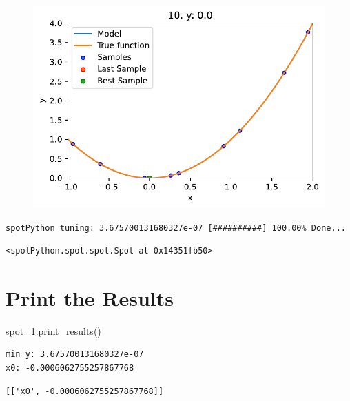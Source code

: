 \documentclass[
  letterpaper,
  DIV=11,
  numbers=noendperiod]{scrreprt}
\newenvironment{Shaded}{\begin{snugshade}}{\end{snugshade}}
\newcommand{\NormalTok}[1]{\textcolor[rgb]{0.00,0.23,0.31}{#1}}
\begin{document}
\begin{figure}[H]

{\centering \includegraphics{007_num_spot_intro_files/figure-pdf/cell-10-output-2.pdf}

}

\end{figure}

\begin{verbatim}
spotPython tuning: 3.675700131680327e-07 [##########] 100.00% Done...
\end{verbatim}

\begin{verbatim}
<spotPython.spot.spot.Spot at 0x14351fb50>
\end{verbatim}

\hypertarget{print-the-results-1}{%
\section{Print the Results}\label{print-the-results-1}}

\begin{Shaded}
\begin{Highlighting}[]
\NormalTok{spot\_1.print\_results()}
\end{Highlighting}
\end{Shaded}

\begin{verbatim}
min y: 3.675700131680327e-07
x0: -0.0006062755257867768
\end{verbatim}

\begin{verbatim}
[['x0', -0.0006062755257867768]]
\end{verbatim}
\end{document}
